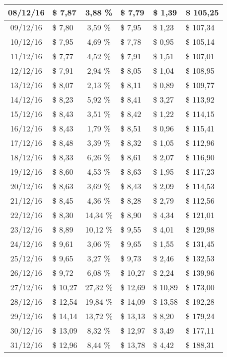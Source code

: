\begin{center}
\begin{small}
\begin{longtable}{|c|l|c|l|l|l|}
08/12/16 & \$ 7,87 & 3,88 \% & \$ 7,79 & \$ 1,39 & \$ 105,25 \\ \hline
09/12/16 & \$ 7,80 & 3,59 \% & \$ 7,95 & \$ 1,23 & \$ 107,34 \\ \hline
10/12/16 & \$ 7,95 & 4,69 \% & \$ 7,78 & \$ 0,95 & \$ 105,14 \\ \hline
11/12/16 & \$ 7,77 & 4,52 \% & \$ 7,91 & \$ 1,51 & \$ 107,01 \\ \hline
12/12/16 & \$ 7,91 & 2,94 \% & \$ 8,05 & \$ 1,04 & \$ 108,95 \\ \hline
13/12/16 & \$ 8,07 & 2,13 \% & \$ 8,11 & \$ 0,89 & \$ 109,77 \\ \hline
14/12/16 & \$ 8,23 & 5,92 \% & \$ 8,41 & \$ 3,27 & \$ 113,92 \\ \hline
15/12/16 & \$ 8,43 & 3,51 \% & \$ 8,42 & \$ 1,22 & \$ 114,15 \\ \hline
16/12/16 & \$ 8,43 & 1,79 \% & \$ 8,51 & \$ 0,96 & \$ 115,41 \\ \hline
17/12/16 & \$ 8,48 & 3,39 \% & \$ 8,32 & \$ 1,05 & \$ 112,96 \\ \hline
18/12/16 & \$ 8,33 & 6,26 \% & \$ 8,61 & \$ 2,07 & \$ 116,90 \\ \hline
19/12/16 & \$ 8,60 & 4,53 \% & \$ 8,63 & \$ 1,95 & \$ 117,23 \\ \hline
20/12/16 & \$ 8,63 & 3,69 \% & \$ 8,43 & \$ 2,09 & \$ 114,53 \\ \hline
21/12/16 & \$ 8,45 & 4,36 \% & \$ 8,28 & \$ 2,79 & \$ 112,56 \\ \hline
22/12/16 & \$ 8,30 & 14,34 \% & \$ 8,90 & \$ 4,34 & \$ 121,01 \\ \hline
23/12/16 & \$ 8,89 & 10,12 \% & \$ 9,55 & \$ 4,01 & \$ 129,98 \\ \hline
24/12/16 & \$ 9,61 & 3,06 \% & \$ 9,65 & \$ 1,55 & \$ 131,45 \\ \hline
25/12/16 & \$ 9,65 & 3,27 \% & \$ 9,73 & \$ 2,46 & \$ 132,53 \\ \hline
26/12/16 & \$ 9,72 & 6,08 \% & \$ 10,27 & \$ 2,24 & \$ 139,96 \\ \hline
27/12/16 & \$ 10,27 & 27,32 \% & \$ 12,69 & \$ 10,89 & \$ 173,00 \\ \hline
28/12/16 & \$ 12,54 & 19,84 \% & \$ 14,09 & \$ 13,58 & \$ 192,28 \\ \hline
29/12/16 & \$ 14,14 & 13,72 \% & \$ 13,13 & \$ 8,20 & \$ 179,24 \\ \hline
30/12/16 & \$ 13,09 & 8,32 \% & \$ 12,97 & \$ 3,49 & \$ 177,11 \\ \hline
31/12/16 & \$ 12,96 & 8,44 \% & \$ 13,78 & \$ 4,42 & \$ 188,31 \\ \hline

\end{longtable}
\end{small}
\end{center}
